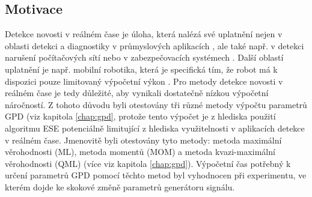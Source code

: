 \subsection{Motivace}
Detekce novosti v reálném čase je úloha, která nalézá své uplatnění nejen v oblasti detekci a diagnostiky v průmyslových aplikacích \cite{fault}, ale také např. v detekci narušení počítačových sítí \cite{data_streams} nebo v zabezpečovacích systémech \cite{surveilance}. Další oblastí uplatnění je např. mobilní robotika, která je specifická tím, že robot má k dispozici pouze limitovaný výpočetní výkon \cite{robotics_marslan,robotics}. Pro metody detekce novosti v reálném čase je tedy důležité, aby vynikali dostatečně nízkou výpočetní náročností. Z tohoto důvodu byli otestovány tři různé metody výpočtu parametrů GPD (viz kapitola \ref{chap:gpd}, protože tento výpočet je z hlediska použití algoritmu ESE potenciálně limitující z hlediska využitelnosti v aplikacích detekce v reálném čase. Jmenovitě byli otestovány tyto metody: metoda maximální věrohodnosti (ML), metoda momentů (MOM) a metoda kvazi-maximální věrohodnosti (QML) (více viz kapitola \ref{chap:gpd}). Výpočetní čas potřebný k určení parametrů GPD pomocí těchto metod byl vyhodnocen při experimentu, ve kterém dojde ke skokové změně parametrů generátoru signálu.
